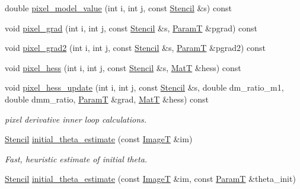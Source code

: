\begin{DoxyCompactItemize}
double \hyperlink{classmappel_1_1Gauss2DModel_a13cf02af379a7b2f7060008a9a7dfc82}{pixel\+\_\+model\+\_\+value} (int i, int j, const \hyperlink{classmappel_1_1Gauss2DModel_1_1Stencil}{Stencil} \&s) const 
\item 
void \hyperlink{classmappel_1_1Gauss2DModel_ae1c726836b5e437721a73183fbf349d7}{pixel\+\_\+grad} (int i, int j, const \hyperlink{classmappel_1_1Gauss2DModel_1_1Stencil}{Stencil} \&s, \hyperlink{classmappel_1_1PointEmitterModel_a665ec6aea3aac139bb69a23c06d4b9a1}{ParamT} \&pgrad) const 
\item 
void \hyperlink{classmappel_1_1Gauss2DModel_a608d40cbec10a7dcfd82913c619748ae}{pixel\+\_\+grad2} (int i, int j, const \hyperlink{classmappel_1_1Gauss2DModel_1_1Stencil}{Stencil} \&s, \hyperlink{classmappel_1_1PointEmitterModel_a665ec6aea3aac139bb69a23c06d4b9a1}{ParamT} \&pgrad2) const 
\item 
void \hyperlink{classmappel_1_1Gauss2DModel_a8d9e4d4cb049e5ebf2649fd073060191}{pixel\+\_\+hess} (int i, int j, const \hyperlink{classmappel_1_1Gauss2DModel_1_1Stencil}{Stencil} \&s, \hyperlink{namespacemappel_a7091ab87c528041f7e2027195fad8915}{MatT} \&hess) const 
\item 
void \hyperlink{classmappel_1_1Gauss2DModel_aa4ada829604d1a79ef92d0df4fdff94c}{pixel\+\_\+hess\+\_\+update} (int i, int j, const \hyperlink{classmappel_1_1Gauss2DModel_1_1Stencil}{Stencil} \&s, double dm\+\_\+ratio\+\_\+m1, double dmm\+\_\+ratio, \hyperlink{classmappel_1_1PointEmitterModel_a665ec6aea3aac139bb69a23c06d4b9a1}{ParamT} \&grad, \hyperlink{namespacemappel_a7091ab87c528041f7e2027195fad8915}{MatT} \&hess) const 
\begin{DoxyCompactList}\small\item\em pixel derivative inner loop calculations. \end{DoxyCompactList}\item 
\hyperlink{classmappel_1_1Gauss2DModel_1_1Stencil}{Stencil} \hyperlink{classmappel_1_1Gauss2DModel_a41572cfae5f8f77ee731a291848fc1c4}{initial\+\_\+theta\+\_\+estimate} (const \hyperlink{classmappel_1_1ImageFormat2DBase_a667ea5016648958e507e7db8eaa041b0}{ImageT} \&im)
\begin{DoxyCompactList}\small\item\em Fast, heuristic estimate of initial theta. \end{DoxyCompactList}\item 
\hyperlink{classmappel_1_1Gauss2DModel_1_1Stencil}{Stencil} \hyperlink{classmappel_1_1Gauss2DModel_ae058886a3f8328a340ea8fe2332113dd}{initial\+\_\+theta\+\_\+estimate} (const \hyperlink{classmappel_1_1ImageFormat2DBase_a667ea5016648958e507e7db8eaa041b0}{ImageT} \&im, const \hyperlink{classmappel_1_1PointEmitterModel_a665ec6aea3aac139bb69a23c06d4b9a1}{ParamT} \&theta\+\_\+init)

\end{DoxyCompactItemize}
